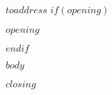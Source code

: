 \documentclass[version=last, fromalign=right, fontsize=11pt]{scrlttr2}
\begin{document}
\begin{letter}{$toaddress$}
  $if(opening)$\opening{$opening$}$endif$

  $body$

  \closing{$closing$}
  \vspace{-5cm}
\end{letter}
\end{document}

